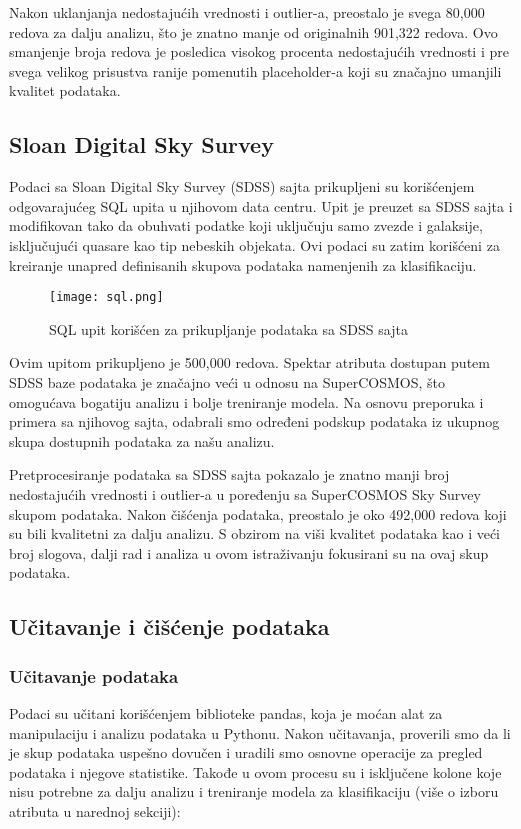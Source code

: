 \documentclass[a4paper,12pt]{article}
\begin{document}
Nakon uklanjanja nedostajućih vrednosti i outlier-a, preostalo je svega 80,000 redova za dalju analizu, što je znatno manje od originalnih 901,322 redova. Ovo smanjenje broja redova je posledica visokog procenta nedostajućih vrednosti i pre svega velikog prisustva ranije pomenutih placeholder-a koji su značajno umanjili kvalitet podataka.

\subsection{Sloan Digital Sky Survey}
Podaci sa Sloan Digital Sky Survey (SDSS) sajta prikupljeni su korišćenjem odgovarajućeg SQL upita u njihovom data centru. Upit je preuzet sa SDSS sajta i modifikovan tako da obuhvati podatke koji uključuju samo zvezde i galaksije, isključujući quasare kao tip nebeskih objekata. Ovi podaci su zatim korišćeni za kreiranje unapred definisanih skupova podataka namenjenih za klasifikaciju.

\begin{figure}[h!]
\centering
\texttt{[image: sql.png]}
\caption{SQL upit korišćen za prikupljanje podataka sa SDSS sajta}
\label{fig:sql_query}
\end{figure}

Ovim upitom prikupljeno je 500,000 redova. Spektar atributa dostupan putem SDSS baze podataka je značajno veći u odnosu na SuperCOSMOS, što omogućava bogatiju analizu i bolje treniranje modela. Na osnovu preporuka i primera sa njihovog sajta, odabrali smo određeni podskup podataka iz ukupnog skupa dostupnih podataka za našu analizu.


Pretprocesiranje podataka sa SDSS sajta pokazalo je znatno manji broj nedostajućih vrednosti i outlier-a u poređenju sa SuperCOSMOS Sky Survey skupom podataka. Nakon čišćenja podataka, preostalo je oko 492,000 redova koji su bili kvalitetni za dalju analizu. S obzirom na viši kvalitet podataka kao i veći broj slogova, dalji rad i analiza u ovom istraživanju fokusirani su na ovaj skup podataka.

\subsection{Učitavanje i čišćenje podataka}


\subsubsection{Učitavanje podataka}
Podaci su učitani korišćenjem biblioteke pandas, koja je moćan alat za manipulaciju i analizu podataka u Pythonu. Nakon učitavanja, proverili smo da li je skup podataka uspešno dovučen i uradili smo osnovne operacije za pregled podataka i njegove statistike. Takođe u ovom procesu su i isključene kolone koje nisu potrebne za dalju analizu i treniranje modela za klasifikaciju (više o izboru atributa u narednoj sekciji):
\end{document}
